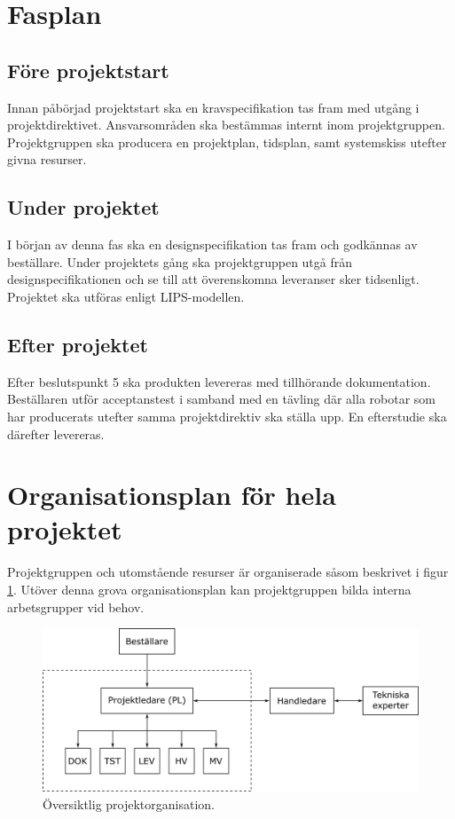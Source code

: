 \documentclass[a4paper,11pt]{article}
\begin{document}
\section{Fasplan}
\subsection{Före projektstart}
Innan påbörjad projektstart ska en kravspecifikation tas fram med utgång i projektdirektivet. Ansvarsområden ska bestämmas internt inom projektgruppen. Projektgruppen ska producera en projektplan, tidsplan, samt systemskiss utefter givna resurser.

\subsection{Under projektet}
I början av denna fas ska en designspecifikation tas fram och godkännas av beställare. Under projektets gång ska projektgruppen utgå från designspecifikationen och se till att överenskomna leveranser sker tidsenligt. Projektet ska utföras enligt LIPS-modellen.

\subsection{Efter projektet}
Efter beslutspunkt 5 ska produkten levereras med tillhörande dokumentation. Beställaren utför acceptanstest i samband med en tävling där alla robotar som har producerats utefter samma projektdirektiv ska ställa upp. En efterstudie ska därefter levereras.


\section{Organisationsplan för hela projektet}
Projektgruppen och utomstående resurser är organiserade såsom beskrivet i figur \ref{fig:org}. Utöver denna grova organisationsplan kan projektgruppen bilda interna arbetsgrupper vid behov.

\begin{figure}[h!]
	\centering
	\includegraphics[scale=1]{organisation.png}
	\caption{Översiktlig projektorganisation.}
	\label{fig:org}
\end{figure}
\end{document}
